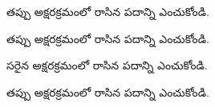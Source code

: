 \begin{questions}
 తప్పు అక్షరక్రమంలో  రాసిన పదాన్ని ఎంచుకోండి.

 తప్పు అక్షరక్రమంలో  రాసిన పదాన్ని ఎంచుకోండి.

 సరైన అక్షరక్రమంలో  రాసిన పదాన్ని ఎంచుకోండి.

 తప్పు అక్షరక్రమంలో  రాసిన పదాన్ని ఎంచుకోండి.

\end{questions}
